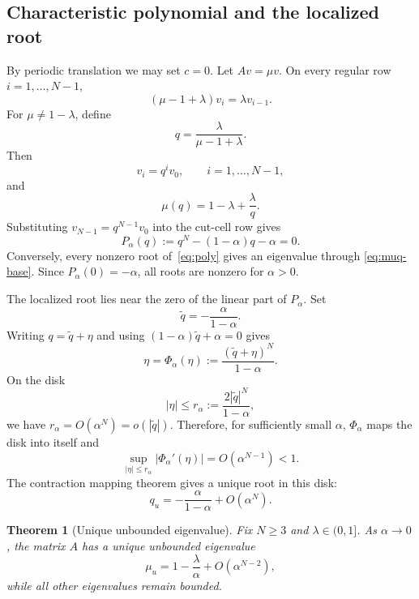 \documentclass[preprint,12pt]{elsarticle}
\newtheorem{theorem}{Theorem}[section]
\begin{document}
\subsection{Characteristic polynomial and the localized root}

By periodic translation we may set $c=0$.  Let $Av=\mu v$.  On every regular
row $i=1,\ldots,N-1$,
\[
    (\mu-1+\lambda)v_i=\lambda v_{i-1}.
\]
For $\mu\ne1-\lambda$, define
\begin{equation}
    q=\frac{\lambda}{\mu-1+\lambda}.
    \label{eq:qdef}
\end{equation}
Then
\begin{equation}
    v_i=q^i v_0,\qquad i=1,\ldots,N-1,
    \label{eq:rec}
\end{equation}
and
\begin{equation}
    \mu(q)=1-\lambda+\frac{\lambda}{q}.
    \label{eq:muq-base}
\end{equation}
Substituting $v_{N-1}=q^{N-1}v_0$ into the cut-cell row gives
\begin{equation}
    P_\alpha(q):=q^N-(1-\alpha)q-\alpha=0.
    \label{eq:poly}
\end{equation}
Conversely, every nonzero root of~\eqref{eq:poly} gives an eigenvalue through
\eqref{eq:muq-base}.  Since $P_\alpha(0)=-\alpha$, all roots are nonzero for
$\alpha>0$.

The localized root lies near the zero of the linear part of $P_\alpha$.  Set
\[
    \widetilde q=-\frac{\alpha}{1-\alpha}.
\]
Writing $q=\widetilde q+\eta$ and using
$(1-\alpha)\widetilde q+\alpha=0$ gives
\[
    \eta=\Phi_\alpha(\eta)
    :=\frac{(\widetilde q+\eta)^N}{1-\alpha}.
\]
On the disk
\[
    |\eta|\le
    r_\alpha:=\frac{2|\widetilde q|^N}{1-\alpha},
\]
we have $r_\alpha=O(\alpha^N)=o(|\widetilde q|)$.  Therefore, for sufficiently
small $\alpha$, $\Phi_\alpha$ maps the disk into itself and
\[
    \sup_{|\eta|\le r_\alpha}|\Phi_\alpha'(\eta)|
    =
    O(\alpha^{N-1})<1.
\]
The contraction mapping theorem gives a unique root in this disk:
\begin{equation}
    q_u=-\frac{\alpha}{1-\alpha}+O(\alpha^N).
    \label{eq:qu}
\end{equation}

\begin{theorem}[Unique unbounded eigenvalue]
\label{thm:eigenvalue}
Fix $N\ge3$ and $\lambda\in(0,1]$.  As $\alpha\to0$, the matrix $A$ has a
unique unbounded eigenvalue
\begin{equation}
    \mu_u
    =
    1-\frac{\lambda}{\alpha}
    +O(\alpha^{N-2}),
    \label{eq:muu}
\end{equation}
while all other eigenvalues remain bounded.
\end{theorem}
\end{document}
